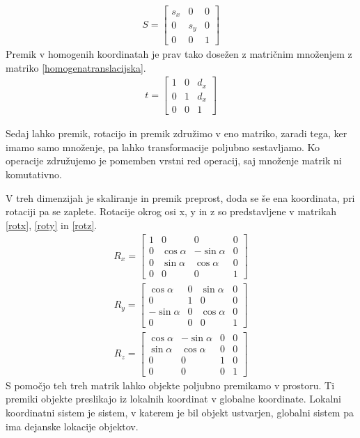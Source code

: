 \documentclass[a4paper, 12pt]{book}
\begin{document}
\begin{align}
S
=
\begin{bmatrix}
s_x & 0 & 0 \\
0 & s_y & 0 \\
0 & 0 & 1 
\end{bmatrix}
\label{homogenaskalirna}
\end{align}
Premik v homogenih koordinatah je prav tako dosežen z matričnim množenjem z matriko \ref{homogenatranslacijska}.
\begin{align}
t
=
\begin{bmatrix}
1 & 0 & d_x \\ 
0 & 1 & d_x \\
0 & 0 & 1
\end{bmatrix}
\label{homogenatranslacijska}
\end{align}

Sedaj lahko premik, rotacijo in premik združimo v eno matriko, zaradi tega, ker imamo samo množenje, pa lahko transformacije poljubno sestavljamo. Ko operacije združujemo je pomemben vrstni red operacij, saj množenje matrik ni komutativno. 

V treh dimenzijah je skaliranje in premik preprost, doda se še ena koordinata, pri rotaciji pa se zaplete. Rotacije okrog osi x, y in z so predstavljene v matrikah \ref{rotx}, \ref{roty} in \ref{rotz}.
\begin{align}
R_x
=
\begin{bmatrix}
1 & 0 & 0 & 0 \\
0 & \cos\alpha & -\sin\alpha & 0 \\
0 & \sin\alpha & \cos\alpha & 0 \\
0 & 0 & 0 & 1
\end{bmatrix}
\label{rotx}
\end{align}
\begin{align}
R_y
=
\begin{bmatrix}
\cos\alpha & 0 & \sin\alpha & 0 \\
0 & 1 & 0 & 0 \\
-\sin\alpha & 0 & \cos\alpha & 0 \\
0 & 0 & 0 & 1
\end{bmatrix}
\label{roty}
\end{align}
\begin{align}
R_z
=
\begin{bmatrix}
\cos\alpha & -\sin\alpha & 0 & 0 \\
\sin\alpha & \cos\alpha & 0 & 0 \\
0 & 0 & 1 & 0 \\
0 & 0 & 0 & 1
\end{bmatrix}
\label{rotz}
\end{align}
S pomočjo teh treh matrik lahko objekte poljubno premikamo v prostoru. Ti premiki objekte preslikajo iz lokalnih koordinat v globalne koordinate. Lokalni koordinatni sistem je sistem, v katerem je bil objekt ustvarjen, globalni sistem pa ima dejanske lokacije objektov.
\end{document}

